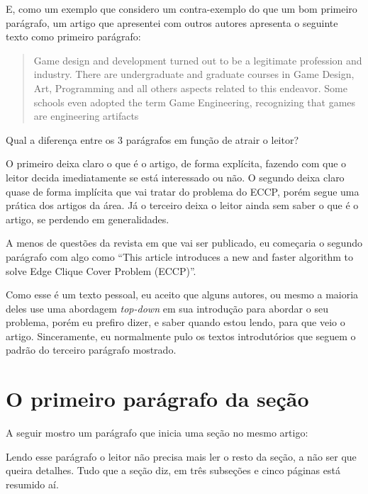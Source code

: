 \documentclass[openany]{book}
\begin{document}
E, como um exemplo que considero um contra-exemplo do que um bom primeiro parágrafo, um artigo que apresentei com outros autores apresenta o seguinte texto como primeiro parágrafo:

\foreignblockquote{english}{Game design and development turned out to be a legitimate profession and industry. There are undergraduate and graduate courses in Game Design, Art, Programming and all others aspects related to this endeavor. Some schools even adopted the term Game Engineering, recognizing that games are engineering artifacts}

Qual a diferença entre os 3 parágrafos em função de atrair o leitor?

O primeiro deixa claro o que é o artigo, de forma explícita, fazendo com que o leitor decida imediatamente se está interessado ou não. O segundo deixa claro quase de forma implícita que vai tratar do problema do ECCP, porém segue uma prática dos artigos da área. Já o terceiro deixa o leitor ainda sem saber o que é o artigo, se perdendo em generalidades.

A menos de questões da revista em que vai ser publicado, eu começaria o segundo parágrafo com algo como \enquote{This article introduces a new and faster algorithm to solve Edge Clique Cover Problem (ECCP)}.

Como esse é um texto pessoal, eu aceito que alguns autores, ou mesmo a maioria deles use uma abordagem \textit{top-down} em sua introdução para abordar o seu problema, porém eu prefiro dizer, e saber quando estou lendo, para que veio o artigo. Sinceramente, eu normalmente pulo os textos introdutórios que seguem o padrão do terceiro parágrafo mostrado.

\section{O primeiro parágrafo da seção}

  A seguir mostro um parágrafo que inicia uma seção no mesmo artigo:


Lendo esse parágrafo o leitor não precisa mais ler o resto da seção, a não ser que queira detalhes. Tudo que a seção diz, em três subseções e cinco páginas está resumido aí.
\end{document}

